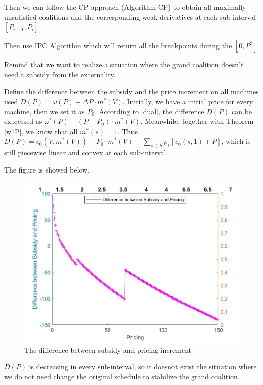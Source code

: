 Then we can follow the CP approach (Algorithm CP) to obtain all maximally unsatisfied coalitions and the corresponding weak derivatives at each sub-interval $[P_{i+1},P_{i}]$

Then use IPC Algorithm which will return all the breakpoints during the $[0, P^*]$

Remind that we want to realize a situation where the grand coalition doesn't need a subsidy from the externality.

Define the difference between the subsidy and the price increment on all machines used $D(P) = \omega(P) - \Delta P\cdot m^*(V)$. Initially, we have a initial price for every machine, then we set it as $P_0$.
According to \ref{dual}, the difference $D(P)$ can be expressed as $\omega^*(P) - (P-P_0)\cdot m^*(V)$. Meanwhile, together with Theorem \ref{w1P}, we know that all $m^*(s) =1$. Thus $D(P) = c_0(V, m^*(V)) + P_0 \cdot m^*(V) - \sum_{s\in S}\rho_s[c_0(s, 1) + P]$, which is still piecewise linear and convex at each sub-interval.

The figure is showed below.
\begin{figure}[h]%
	\centering  %
	\includegraphics[width=0.8\linewidth]{Figures/Imagediff}  %
	\caption{The difference between subsidy and pricing increment}  %
	\label{fig:Imagediff}   %
\end{figure}

$D(P)$ is decreasing in every sub-interval, so it doesnot exist the situation where we do not need change the original schedule to stabilize the grand coalition.

